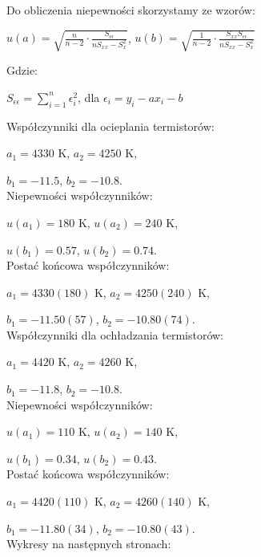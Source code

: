\documentclass[12pt]{article}
\begin{document}
\begin{flushleft}
    Do obliczenia niepewności skorzystamy ze wzorów:
    \begin{center}
        $u(a) = \sqrt{\frac{n}{n-2} \cdot
                \frac{S_{\epsilon\epsilon}}{nS_{xx}-S_x^2}}$, $u(b) =
            \sqrt{\frac{1}{n-2} \cdot
            \frac{S_{xx}S_{\epsilon\epsilon}}{nS_{xx}-S_x^2}}$ \\
    \end{center}
    Gdzie: \\
    \begin{center}
        $S_{\epsilon\epsilon}=\displaystyle\sum_{i=1}^{n}\epsilon_i^2$, dla
        $\epsilon_i = y_i - ax_i - b$
    \end{center}

\end{flushleft}
Współczynniki dla ocieplania termistorów:

$a_1 = 4330$ K, $a_2 = 4250$ K,

$b_1 = -11.5$, $b_2 = -10.8$. \\
Niepewności współczynników:

$u(a_1) = 180$ K, $u(a_2) = 240$ K,

$u(b_1) = 0.57$, $u(b_2) = 0.74$. \\
Postać końcowa współczynników:

$a_1 = 4330(180)$ K, $a_2 = 4250(240)$ K,

$b_1 = -11.50(57)$, $b_2 = -10.80(74)$. \\
Współczynniki dla ochładzania termistorów:

$a_1 = 4420$ K, $ a_2 = 4260$ K,

$b_1 = -11.8$, $b_2 = -10.8$. \\
Niepewności współczynników:

$u(a_1) = 110$ K, $u(a_2) = 140$ K,

$u(b_1) = 0.34$, $u(b_2) = 0.43$. \\
Postać końcowa współczynników:

$a_1 = 4420(110)$ K, $a_2 = 4260(140)$ K,

$b_1 = -11.80(34)$, $b_2 = -10.80(43)$. \\
Wykresy na następnych stronach:



\end{document}
